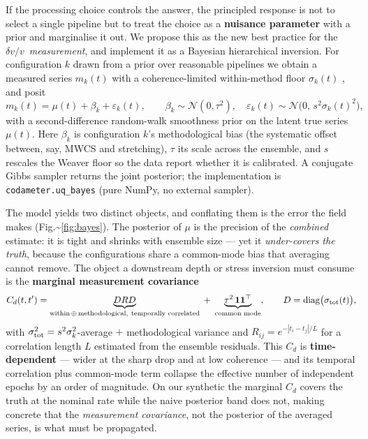 \documentclass[
  referee]{gji}
\providecommand{\dvv}{\ensuremath{\delta v/v}}
\begin{document}
If the processing choice controls the answer, the principled response is
not to select a single pipeline but to treat the choice as a
\textbf{nuisance parameter} with a prior and marginalise it out. We
propose this as the new best practice for the \dvv~\emph{measurement},
and implement it as a Bayesian hierarchical inversion. For configuration
\(k\) drawn from a prior over reasonable pipelines we obtain a measured
series \(m_k(t)\) with a coherence-limited within-method floor
\(\sigma_k(t)\) \citep{Weaver2011, Clarke2011}, and posit
\begin{equation}
m_k(t) = \mu(t) + \beta_k + \varepsilon_k(t), \qquad
\beta_k\sim\mathcal N(0,\tau^2),\quad
\varepsilon_k(t)\sim\mathcal N\!\big(0,\,s^2\sigma_k(t)^2\big),
\label{eq:bayes}
\end{equation} with a second-difference random-walk smoothness prior on
the latent true series \(\mu(t)\). Here \(\beta_k\) is configuration
\(k\)'s methodological bias (the systematic offset between, say, MWCS
and stretching), \(\tau\) its scale across the ensemble, and \(s\)
rescales the Weaver floor so the data report whether it is calibrated. A
conjugate Gibbs sampler returns the joint posterior; the implementation
is \texttt{codameter.uq\_bayes} (pure NumPy, no external sampler).

The model yields two distinct objects, and conflating them is the error
the field makes (Fig.\textasciitilde{}\ref{fig:bayes}). The posterior of
\(\mu\) is the precision of the \emph{combined} estimate: it is tight
and shrinks with ensemble size --- yet it \emph{under-covers the truth},
because the configurations share a common-mode bias that averaging
cannot remove. The object a downstream depth or stress inversion must
consume is the \textbf{marginal measurement covariance} \begin{equation}
C_d(t,t') = \underbrace{D R D}_{\text{within}\,\oplus\,\text{methodological},\ \text{temporally correlated}}
\;+\; \underbrace{\tau^2\,\mathbf{1}\mathbf{1}^\top}_{\text{common mode}},
\qquad D=\operatorname{diag}\!\big(\sigma_{\rm tot}(t)\big),
\label{eq:cd}
\end{equation} with \(\sigma_{\rm tot}^2 = s^2\sigma_k^2\)-average \(+\)
methodological variance and \(R_{ij}=e^{-|t_i-t_j|/L}\) for a
correlation length \(L\) estimated from the ensemble residuals. This
\(C_d\) is \textbf{time-dependent} --- wider at the sharp drop and at
low coherence --- and its temporal correlation plus common-mode term
collapse the effective number of independent epochs by an order of
magnitude. On our synthetic the marginal \(C_d\) covers the truth at the
nominal rate while the naive posterior band does not, making concrete
that the \emph{measurement covariance}, not the posterior of the
averaged series, is what must be propagated.
\end{document}
